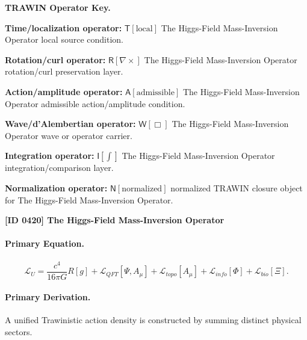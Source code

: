 \par\vspace{0.45\baselineskip}
\noindent\begin{minipage}[t]{\linewidth}
\begingroup
\small
\raggedright
\textbf{TRAWIN Operator Key.}\par
\noindent\textbf{Time/localization operator:} $\mathsf{T}\!\left[\mathrm{local}\right]$ The Higgs-Field Mass-Inversion Operator local source condition.\par
\noindent\textbf{Rotation/curl operator:} $\mathsf{R}\!\left[\nabla\times\right]$ The Higgs-Field Mass-Inversion Operator rotation/curl preservation layer.\par
\noindent\textbf{Action/amplitude operator:} $\mathsf{A}\!\left[\mathrm{admissible}\right]$ The Higgs-Field Mass-Inversion Operator admissible action/amplitude condition.\par
\noindent\textbf{Wave/d'Alembertian operator:} $\mathsf{W}\!\left[\Box\right]$ The Higgs-Field Mass-Inversion Operator wave or operator carrier.\par
\noindent\textbf{Integration operator:} $\mathsf{I}\!\left[\int\right]$ The Higgs-Field Mass-Inversion Operator integration/comparison layer.\par
\noindent\textbf{Normalization operator:} $\mathsf{N}\!\left[\mathrm{normalized}\right]$ normalized TRAWIN closure object for The Higgs-Field Mass-Inversion Operator.\par
\endgroup
\end{minipage}

\clearpage
\noindent\textbf{[ID 0420] The Higgs-Field Mass-Inversion Operator}\par
\vspace{0.35em}
\paragraph{Primary Equation.}
\begin{equation}
\mathcal{L}_U
=
\frac{c^4}{16\pi G}R[g]
+
\mathcal{L}_{QFT}[\Psi,A_\mu]
+
\mathcal{L}_{topo}[A_\mu]
+
\mathcal{L}_{info}[\Phi]
+
\mathcal{L}_{bio}[\Xi].
\end{equation}

\paragraph{Primary Derivation.}
A unified Trawinistic action density is constructed by summing distinct physical sectors.

